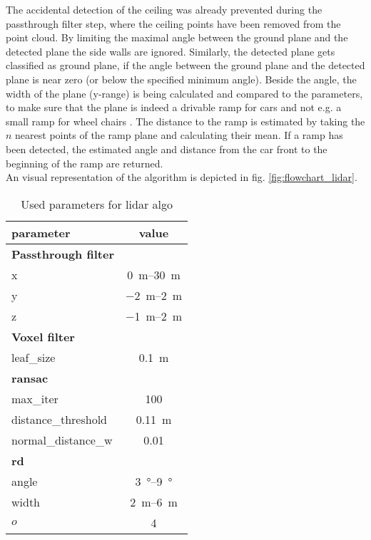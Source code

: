 The accidental detection of the ceiling was already prevented during the passthrough filter step, where the ceiling points have been removed from the point cloud.
By limiting the maximal angle between the ground plane and the detected plane the side walls are ignored.
Similarly, the detected plane gets classified as ground plane, if the angle between the ground plane and the detected plane is near zero (or below the specified minimum angle).
Beside the angle, the width of the plane (y-range) is being calculated and compared to the parameters, to make sure that the plane is indeed a drivable ramp for cars and not e.g. a small ramp for wheel chairs .
The distance to the ramp is estimated by taking the $n$ nearest points of the ramp plane and calculating their mean.
If a ramp has been detected, the estimated angle and distance from the car front to the beginning of the ramp are returned.\\
An visual representation of the algorithm is depicted in fig. \ref{fig:flowchart_lidar}.
\begin{table}[H]
    \centering
    \caption{Used parameters for lidar algo}
    \label{tab:lidar_params}
    \begin{tabular}[t]{lc}
        \toprule
        \textbf{parameter}  & \textbf{value}          \\
        \midrule
        \textbf{Passthrough filter}                   \\
        x                   & \SIrange{0}{30}{\metre} \\
        y                   & \SIrange{-2}{2}{\metre} \\
        z                   & \SIrange{-1}{2}{\metre} \\
        \midrule
        \textbf{Voxel filter}                         \\
        leaf\_size          & \SI{0.1}{\metre}        \\
        \midrule
        \textbf{\gls{ransac}}                         \\
        max\_iter           & 100                     \\
        distance\_threshold & \SI{0.11}{\metre}       \\
        normal\_distance\_w & 0.01                    \\
        \midrule
        \textbf{rd}                                   \\
        angle               & \SIrange{3}{9}{\degree} \\
        width               & \SIrange{2}{6}{\metre}  \\
        $o$                 & 4                       \\
        \bottomrule
    \end{tabular}
\end{table}%



